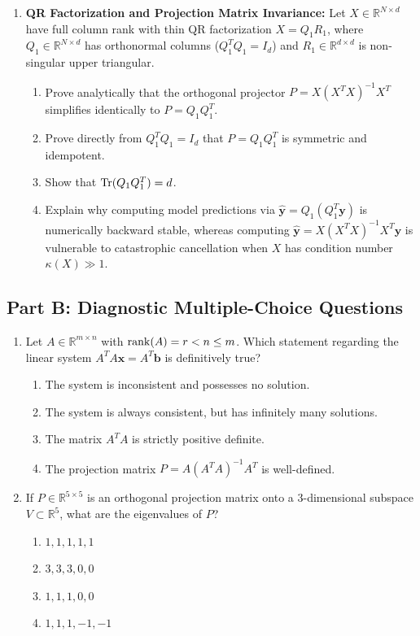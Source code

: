 \begin{enumerate}[label=\textbf{P\arabic*.}]
    \item \textbf{QR Factorization and Projection Matrix Invariance:}
    Let $X \in \mathbb{R}^{N \times d}$ have full column rank with thin QR factorization $X = Q_1 R_1$, where $Q_1 \in \mathbb{R}^{N \times d}$ has orthonormal columns ($Q_1^T Q_1 = I_d$) and $R_1 \in \mathbb{R}^{d \times d}$ is non-singular upper triangular.
    \begin{enumerate}[label=(\alph*)]
        \item Prove analytically that the orthogonal projector $P = X(X^T X)^{-1}X^T$ simplifies identically to $P = Q_1 Q_1^T$.
        \item Prove directly from $Q_1^T Q_1 = I_d$ that $P = Q_1 Q_1^T$ is symmetric and idempotent.
        \item Show that $\operatorname{Tr}(Q_1 Q_1^T) = d$.
        \item Explain why computing model predictions via $\hat{\mathbf{y}} = Q_1 (Q_1^T \mathbf{y})$ is numerically backward stable, whereas computing $\hat{\mathbf{y}} = X(X^T X)^{-1}X^T \mathbf{y}$ is vulnerable to catastrophic cancellation when $X$ has condition number $\kappa(X) \gg 1$.
    \end{enumerate}
\end{enumerate}

\subsection*{Part B: Diagnostic Multiple-Choice Questions}

\begin{enumerate}[label=\textbf{MCQ\arabic*.}]
    \item Let $A \in \mathbb{R}^{m \times n}$ with $\operatorname{rank}(A) = r < n \le m$. Which statement regarding the linear system $A^T A \mathbf{x} = A^T \mathbf{b}$ is definitively true?
    \begin{enumerate}[label=(\alph*)]
        \item The system is inconsistent and possesses no solution.
        \item The system is always consistent, but has infinitely many solutions.
        \item The matrix $A^T A$ is strictly positive definite.
        \item The projection matrix $P = A(A^T A)^{-1}A^T$ is well-defined.
    \end{enumerate}

    \item If $P \in \mathbb{R}^{5 \times 5}$ is an orthogonal projection matrix onto a 3-dimensional subspace $V \subset \mathbb{R}^5$, what are the eigenvalues of $P$?
    \begin{enumerate}[label=(\alph*)]
        \item $1, 1, 1, 1, 1$
        \item $3, 3, 3, 0, 0$
        \item $1, 1, 1, 0, 0$
        \item $1, 1, 1, -1, -1$
    \end{enumerate}
\end{enumerate}
